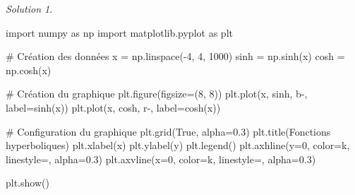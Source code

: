 \documentclass[
  12pt,
  letterpaper,
]{book}
\newenvironment{Shaded}{}{}
\newcommand{\CommentTok}[1]{\textcolor[rgb]{0.42,0.45,0.49}{#1}}
\newcommand{\DecValTok}[1]{\textcolor[rgb]{0.00,0.36,0.77}{#1}}
\newcommand{\FloatTok}[1]{\textcolor[rgb]{0.00,0.36,0.77}{#1}}
\newcommand{\ImportTok}[1]{\textcolor[rgb]{0.01,0.18,0.38}{#1}}
\newcommand{\NormalTok}[1]{\textcolor[rgb]{0.14,0.16,0.18}{#1}}
\newcommand{\OperatorTok}[1]{\textcolor[rgb]{0.14,0.16,0.18}{#1}}
\newcommand{\StringTok}[1]{\textcolor[rgb]{0.01,0.18,0.38}{#1}}
\newcommand{\VariableTok}[1]{\textcolor[rgb]{0.89,0.38,0.04}{#1}}
\theoremstyle{remark}
\newtheorem*{solution}{Solution}
\begin{document}
\begin{solution}

\begin{Shaded}
\begin{Highlighting}[]
\ImportTok{import}\NormalTok{ numpy }\ImportTok{as}\NormalTok{ np}
\ImportTok{import}\NormalTok{ matplotlib.pyplot }\ImportTok{as}\NormalTok{ plt}

\CommentTok{\# Création des données}
\NormalTok{x }\OperatorTok{=}\NormalTok{ np.linspace(}\OperatorTok{{-}}\DecValTok{4}\NormalTok{, }\DecValTok{4}\NormalTok{, }\DecValTok{1000}\NormalTok{)}
\NormalTok{sinh }\OperatorTok{=}\NormalTok{ np.sinh(x)}
\NormalTok{cosh }\OperatorTok{=}\NormalTok{ np.cosh(x)}

\CommentTok{\# Création du graphique}
\NormalTok{plt.figure(figsize}\OperatorTok{=}\NormalTok{(}\DecValTok{8}\NormalTok{, }\DecValTok{8}\NormalTok{))}
\NormalTok{plt.plot(x, sinh, }\StringTok{\textquotesingle{}b{-}\textquotesingle{}}\NormalTok{, label}\OperatorTok{=}\StringTok{\textquotesingle{}sinh(x)\textquotesingle{}}\NormalTok{)}
\NormalTok{plt.plot(x, cosh, }\StringTok{\textquotesingle{}r{-}\textquotesingle{}}\NormalTok{, label}\OperatorTok{=}\StringTok{\textquotesingle{}cosh(x)\textquotesingle{}}\NormalTok{)}

\CommentTok{\# Configuration du graphique}
\NormalTok{plt.grid(}\VariableTok{True}\NormalTok{, alpha}\OperatorTok{=}\FloatTok{0.3}\NormalTok{)}
\NormalTok{plt.title(}\StringTok{\textquotesingle{}Fonctions hyperboliques\textquotesingle{}}\NormalTok{)}
\NormalTok{plt.xlabel(}\StringTok{\textquotesingle{}x\textquotesingle{}}\NormalTok{)}
\NormalTok{plt.ylabel(}\StringTok{\textquotesingle{}y\textquotesingle{}}\NormalTok{)}
\NormalTok{plt.legend()}
\NormalTok{plt.axhline(y}\OperatorTok{=}\DecValTok{0}\NormalTok{, color}\OperatorTok{=}\StringTok{\textquotesingle{}k\textquotesingle{}}\NormalTok{, linestyle}\OperatorTok{=}\StringTok{\textquotesingle{}{-}\textquotesingle{}}\NormalTok{, alpha}\OperatorTok{=}\FloatTok{0.3}\NormalTok{)}
\NormalTok{plt.axvline(x}\OperatorTok{=}\DecValTok{0}\NormalTok{, color}\OperatorTok{=}\StringTok{\textquotesingle{}k\textquotesingle{}}\NormalTok{, linestyle}\OperatorTok{=}\StringTok{\textquotesingle{}{-}\textquotesingle{}}\NormalTok{, alpha}\OperatorTok{=}\FloatTok{0.3}\NormalTok{)}

\NormalTok{plt.show()}
\end{Highlighting}
\end{Shaded}

\begin{figure}[H]


\end{figure}
\end{solution}
\end{document}
